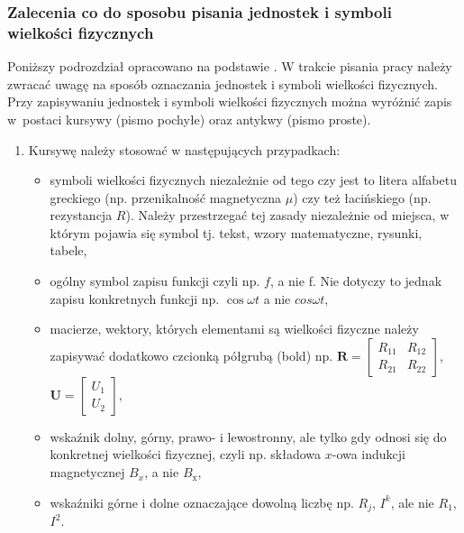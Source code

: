 \documentclass[12pt,twoside]{article}
\begin{document}
\subsubsection{Zalecenia co do sposobu pisania jednostek i symboli wielkości fizycznych}

Poniższy podrozdział opracowano na podstawie \cite{Pawluk2001}. W trakcie pisania pracy należy zwracać uwagę na sposób oznaczania jednostek i symboli wielkości fizycznych. Przy zapisywaniu jednostek i symboli wielkości fizycznych można wyróżnić zapis w~postaci kursywy (pismo pochyłe) oraz antykwy (pismo proste). 

\begin{enumerate}[label=\arabic*), leftmargin=1.25cm]
\item Kursywę należy stosować w następujących przypadkach:

\begin{itemize}[label=-,labelsep=0.4cm,leftmargin=0.6cm] %
\item symboli wielkości fizycznych niezależnie od tego czy jest to litera alfabetu greckiego (np. przenikalność magnetyczna $\mu$) czy też łacińskiego (np. rezystancja $R$). Należy przestrzegać tej zasady niezależnie od miejsca, w którym pojawia się symbol tj. tekst, wzory matematyczne, rysunki, tabele,

\item ogólny symbol zapisu funkcji czyli np. $f$, a nie f. Nie dotyczy to jednak zapisu konkretnych funkcji np. $\cos \omega t$ a nie $cos \omega t$,

\item macierze, wektory, których elementami są wielkości fizyczne należy zapisywać dodatkowo czcionką półgrubą (bold) np. 
$\bm{R} = \left[ 
\begin{array}{cc}
R_{11} & R_{12} \\
R_{21} & R_{22} 
\end{array} 
\right]$,
$\bm{U} = \left[ 
\begin{array}{c}
U_{1} \\
U_{2} 
\end{array} 
\right]$,

\item wskaźnik dolny, górny, prawo- i lewostronny, ale tylko gdy odnosi się do konkretnej wielkości fizycznej, czyli np. składowa $x$-owa indukcji magnetycznej $B_x$, a nie $B_{\mathrm{x}}$,

\item wskaźniki górne i dolne oznaczające dowolną liczbę np. $R_j$, $I^k$, ale nie $R_\mathit{1}$, $I^\mathit{2}$.


\end{itemize}
\end{enumerate}
\end{document}
